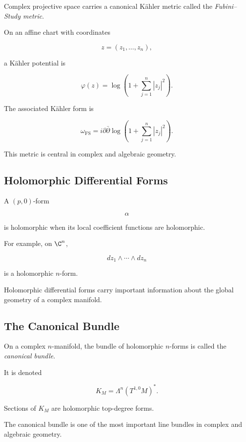 Complex projective space carries a canonical K\"ahler metric called the
\emph{Fubini--Study metric}.

On an affine chart with coordinates

\[
z=(z_1,\ldots,z_n),
\]

a K\"ahler potential is

\[
\boxed{
\varphi(z)
=
\log
\left(
1+\sum_{j=1}^{n}|z_j|^2
\right).
}
\]

The associated K\"ahler form is

\[
\boxed{
\omega_{\mathrm{FS}}
=
i\partial\bar{\partial}
\log
\left(
1+\sum_{j=1}^{n}|z_j|^2
\right).
}
\]

This metric is central in complex and algebraic geometry.

\subsection{Holomorphic Differential Forms}
\label{subsec:holomorphic-differential-forms}

A \((p,0)\)-form

\[
\alpha
\]

is holomorphic when its local coefficient functions are holomorphic.

For example, on \(\C^n\),

\[
\boxed{
dz_1\wedge\cdots\wedge dz_n
}
\]

is a holomorphic \(n\)-form.

Holomorphic differential forms carry important information about the global
geometry of a complex manifold.

\subsection{The Canonical Bundle}
\label{subsec:canonical-bundle-complex}

On a complex \(n\)-manifold, the bundle of holomorphic \(n\)-forms is called
the \emph{canonical bundle}.

It is denoted

\[
\boxed{
K_M
=
\Lambda^n(T^{1,0}M)^*.
}
\]

Sections of \(K_M\) are holomorphic top-degree forms.

The canonical bundle is one of the most important line bundles in complex
and algebraic geometry.

